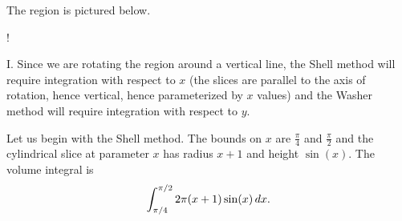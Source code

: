 \documentclass[]{ximera}
\begin{document}
\begin{freeResponse}
The region is pictured below. 
\begin{center}
\resizebox {6cm} {!} {
}
	\end{center}
	
I. Since we are rotating the region around a vertical line, the Shell method will require integration with respect to $x$ (the slices are parallel to the axis of rotation, hence vertical, hence parameterized by $x$ values) and the Washer method will require integration with respect to $y$. 

Let us begin with the Shell method. The bounds on $x$ are $\frac{\pi}{4}$ and $\frac{\pi}{2}$ and the cylindrical slice at parameter $x$ has radius $x+1$ and height $\sin (x)$. The volume integral is
$$
\int_{\pi/4}^{\pi/2} 2\pi (x+1) \sin (x) \mathop{}\!d x.
$$


\end{freeResponse}
\end{document}
